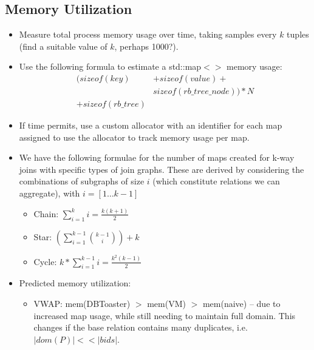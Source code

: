 \documentclass{sig-alternate}
\begin{document}
\subsection{Memory Utilization}
\begin{itemize}
\item Measure total process memory usage over time, taking samples every $k$
  tuples (find a suitable value of $k$, perhaps 1000?).
\item Use the following formula to estimate a std::map$<>$ memory usage:
\begin{align*}
(sizeof(key) & + sizeof(value) + \\
& sizeof(rb\_tree\_node))*N\\
+ sizeof(rb\_tree)
\end{align*}

\item If time permits, use a custom allocator with an identifier for each map
assigned to use the allocator to track memory usage per map.

\item We have the following formulae for the number of maps created for k-way
joins with specific types of join graphs. These are derived by considering the
combinations of subgraphs of size $i$ (which constitute relations we can
aggregate), with $i = [1 \ldots k-1]$
    \begin{itemize}
    \item Chain: $\sum_{i=1}^{k}{i} = \frac{k(k+1)}{2}$
    \item Star: $(\sum_{i=1}^{k-1}{\binom{k-1}{i}}) + k $
    \item Cycle: $k*\sum_{i=1}^{k-1}{i} = \frac{k^2(k-1)}{2}$
    \end{itemize}

\item Predicted memory utilization:
    \begin{itemize}
    \item VWAP: mem(DBToaster) $>$ mem(VM) $>$ mem(naive) -- due to increased
    map usage, while still needing to maintain full domain. This changes if the base
    relation contains many duplicates, i.e. $|dom(P)| << |bids|$.
    \end{itemize}
\end{itemize}
\end{document}
